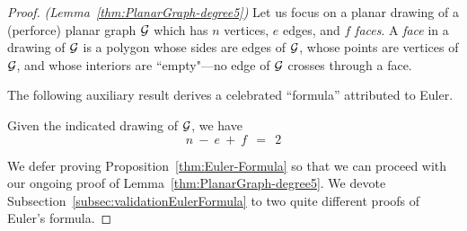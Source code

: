 \begin{proof} {\em (Lemma~\ref{thm:PlanarGraph-degree5})}
Let us focus on a planar drawing of a (perforce) planar graph $\mbox{$\cal G$}$ which has $n$ vertices, $e$ edges, and $f$ {\it faces}.  A {\it face} in a drawing of $\mbox{$\cal G$}$ is a polygon whose sides are edges of
$\mbox{$\cal G$}$, whose points are vertices of $\mbox{$\cal G$}$, and whose interiors are ``empty"---no edge of $\mbox{$\cal G$}$ crosses through a face.

\bigskip

\noindent {}
\bigskip

The following auxiliary result derives a celebrated ``formula'' attributed to Euler.

 

\begin{prop} 
\label{thm:Euler-Formula}
Given the indicated drawing of $\mbox{$\cal G$}$, we have
\begin{equation}
\label{eqn:Eulers-formula}
n \ - \ e \ + \ f \ \ = \ \ 2
\end{equation}
\end{prop}

\medskip

We defer proving Proposition~\ref{thm:Euler-Formula} so that we can proceed with our ongoing proof of Lemma~\ref{thm:PlanarGraph-degree5}.  We devote Subsection~\ref{subsec:validationEulerFormula} to two quite different proofs of Euler's formula.

\medskip



\end{proof}
